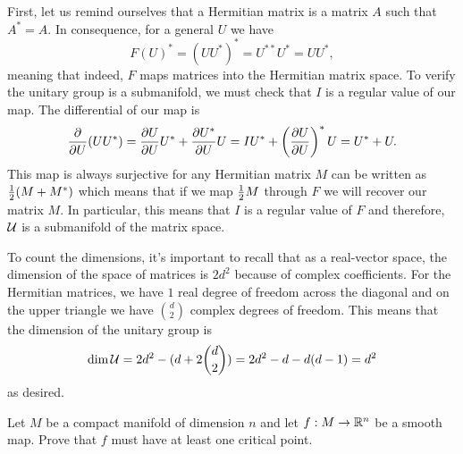 \documentclass[12pt]{memoir}
\begin{document}
   \begin{ptcbr}
	First, let us remind ourselves that a Hermitian matrix is a matrix $A$ such that $A^\ast=A$. In consequence, for a general $U$ we have
	$$F(U)^\ast=(UU^\ast)^\ast=U^{\ast\ast}U^\ast=UU^\ast,$$
	meaning that indeed, $F$ maps matrices into the Hermitian matrix space. To verify the unitary group is a submanifold, we must check that $I$ is a regular value of our map. The differential of our map is 
	$$\pdv{U}(UU^\ast)=\pdv{U}{U}U^\ast+\pdv{U^\ast}{U}U=IU^\ast+\left(\pdv{U}{U}\right)^\ast U=U^\ast+U.$$
	This map is always surjective for any Hermitian matrix $M$ can be written as $\half(M+M^\ast)$ which means that if we map $\half M$ through $F$ we will recover our matrix $M$. In particular, this means that $I$ is a regular value of $F$ and therefore, $\mathcal{U}$ is a submanifold of the matrix space.\par
	To count the dimensions, it's important to recall that as a real-vector space, the dimension of the space of matrices is $2d^2$ because of complex coefficients. For the Hermitian matrices, we have $1$ real degree of freedom across the diagonal and on the upper triangle we have $\binom{d}{2}$ complex degrees of freedom. This means that the dimension of the unitary group is 
	$$\dim\mathcal{U}=2d^2-(d+2\binom{d}{2})=2d^2-d-d(d-1)=d^2$$
	as desired.
   \end{ptcbr}

   \begin{Ej}
    Let $M$ be a compact manifold of dimension $n$ and let $f:M \to \mathbb{R}^n$ be a smooth map. Prove that $f$ must have at least one critical point.
   \end{Ej}
\end{document}
